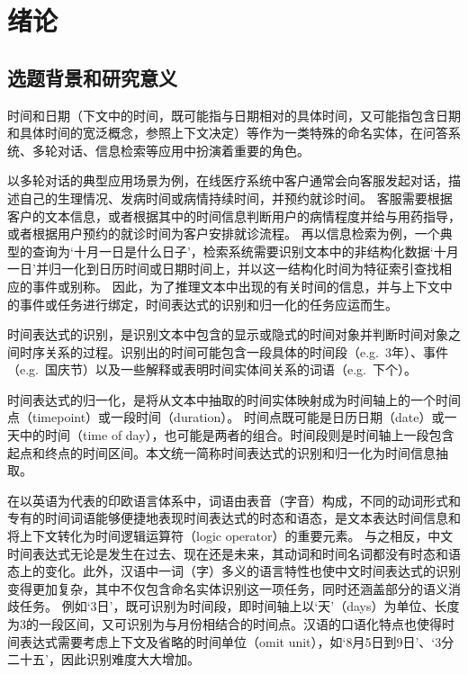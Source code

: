 
\chapter{绪论}

\section{选题背景和研究意义}

时间和日期（下文中的时间，既可能指与日期相对的具体时间，又可能指包含日期和具体时间的宽泛概念，参照上下文决定）等作为一类特殊的命名实体，在问答系统、多轮对话、信息检索等应用中扮演着重要的角色。

以多轮对话的典型应用场景为例，在线医疗系统中客户通常会向客服发起对话，描述自己的生理情况、发病时间或病情持续时间，并预约就诊时间。
客服需要根据客户的文本信息，或者根据其中的时间信息判断用户的病情程度并给与用药指导，或者根据用户预约的就诊时间为客户安排就诊流程。
再以信息检索为例，一个典型的查询为‘十月一日是什么日子’，检索系统需要识别文本中的非结构化数据‘十月一日’并归一化到日历时间或日期时间上，并以这一结构化时间为特征索引查找相应的事件或别称。
因此，为了推理文本中出现的有关时间的信息，并与上下文中的事件或任务进行绑定，时间表达式的识别和归一化的任务应运而生。

时间表达式的识别，是识别文本中包含的显示或隐式的时间对象并判断时间对象之间时序关系的过程。识别出的时间可能包含一段具体的时间段（e.g.\ 3年）、事件（e.g.\ 国庆节）以及一些解释或表明时间实体间关系的词语（e.g.\ 下个）。

时间表达式的归一化，是将从文本中抽取的时间实体映射成为时间轴上的一个时间点（timepoint）或一段时间（duration）。
时间点既可能是日历日期（date）或一天中的时间（time of day），也可能是两者的组合。时间段则是时间轴上一段包含起点和终点的时间区间。本文统一简称时间表达式的识别和归一化为时间信息抽取。

在以英语为代表的印欧语言体系中，词语由表音（字音）构成，不同的动词形式和专有的时间词语能够便捷地表现时间表达式的时态和语态，是文本表达时间信息和将上下文转化为时间逻辑运算符（logic operator）的重要元素。
与之相反，中文时间表达式无论是发生在过去、现在还是未来，其动词和时间名词都没有时态和语态上的变化。此外，汉语中一词（字）多义的语言特性也使中文时间表达式的识别变得更加复杂，其中不仅包含命名实体识别这一项任务，同时还涵盖部分的语义消歧任务。
例如‘3日’，既可识别为时间段，即时间轴上以‘天’（days）为单位、长度为3的一段区间，又可识别为与月份相结合的时间点。汉语的口语化特点也使得时间表达式需要考虑上下文及省略的时间单位（omit unit），如‘8月5日到9日’、‘3分二十五’，因此识别难度大大增加。

